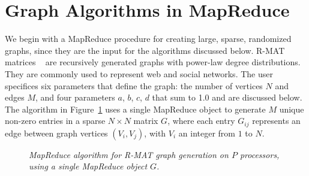 \section{Graph Algorithms in MapReduce}
\label{sec:graph}

We begin with a MapReduce procedure for creating large, sparse,
randomized graphs, since they are the input for the algorithms
discussed below.  R-MAT matrices ~\cite{RMAT} are recursively
generated graphs with power-law degree distributions.  They are
commonly used to represent web and social networks.  The user
specifices six parameters that define the graph: the number of
vertices $N$ and edges $M$, and four parameters $a$, $b$, $c$, $d$
that sum to 1.0 and are discussed below.  The algorithm in
Figure~\ref{fig:rmat} uses a single MapReduce object to generate $M$
unique non-zero entries in a sparse $N \times N$ matrix $G$, where
each entry $G_{ij}$ represents an edge between graph vertices
$(V_i,V_j)$, with $V_i$ an integer from $1$ to $N$.

\begin{figure}[htb]
 \begin{center}\end{center}


 \caption{\it MapReduce algorithm for R-MAT graph generation on $P$
 processors, using a single MapReduce object $G$.}

 \label{fig:rmat}
\end{figure}

